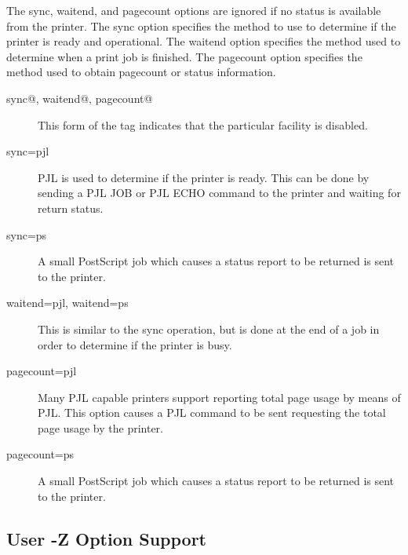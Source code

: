 \documentclass[a4paper]{article}
\begin{document}
The {\ttfamily sync}, {\ttfamily waitend}, and {\ttfamily pagecount}
options are ignored if no status is available from the printer.
The {\ttfamily sync} option specifies the method to use to
determine if the printer is ready and operational.
The {\ttfamily waitend} option specifies the method used to determine
when a print job is finished.
The {\ttfamily pagecount} option specifies the method used to obtain pagecount
or status information.
\begin{description}
\item[sync@, waitend@, pagecount@ ] \mbox{}

This form of the tag indicates that the particular facility is disabled.



\item[sync=pjl] \mbox{}

PJL is used to determine if the printer is ready.
This can be done by sending a {\ttfamily PJL JOB} or {\ttfamily PJL ECHO}
command to the printer and waiting for return status.



\item[sync=ps] \mbox{}

A small PostScript job which causes a status report to be returned
is sent to the printer.



\item[waitend=pjl, waitend=ps] \mbox{}

This is similar to the {\ttfamily sync} operation,
but is done at the end of a job in order to determine if the
printer is busy.



\item[pagecount=pjl] \mbox{}

Many PJL capable printers support reporting total page usage by
means of PJL.
This option causes a PJL command to be sent requesting the
total page usage by the printer.



\item[pagecount=ps] \mbox{}

A small PostScript job which causes a status report to be returned
is sent to the printer.

\end{description}



\subsection{User -Z Option Support}
\end{document}
